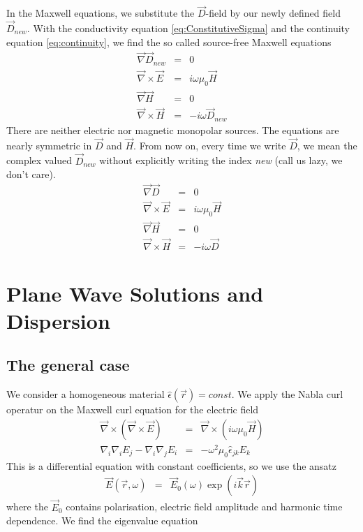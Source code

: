 \documentclass[12pt,a4paper,twoside,openright,BCOR10mm,headsepline,titlepage,abstracton,chapterprefix,final]{scrreprt}
\newcommand\vacuum{0}
\newcommand\Location{\Vector{r}}
\newcommand\wavenumber{k}
\newcommand\Wavevector{\Vector{\wavenumber}}
\newcommand\Vector[1]{\vec{#1}}
\newcommand\Nabla{\Vector{\nabla}}
\newcommand\Tensor[1]{\hat{#1}}
\newcommand\scalarEfield{E}
\newcommand\scalarHfield{H}
\newcommand\scalarDfield{D}
\newcommand\Efield{\Vector{\scalarEfield}}
\newcommand\Hfield{\Vector{\scalarHfield}}
\newcommand\Dfield{\Vector{\scalarDfield}}
\newcommand\vacuumpermeability{\mu_{\vacuum}}
\newcommand\permittivity{\Tensor{\epsilon}}
\begin{document}
In the Maxwell equations, we substitute the $\Dfield$-field by our newly defined field $\Dfield_{new}$.
With the conductivity equation \ref{eq:ConstitutiveSigma} and the continuity equation \ref{eq:continuity}, we find the so called source-free Maxwell equations
\begin{subequations}
\begin{eqnarray}
  \Nabla \Dfield_{new} &=& 0 					\\
  \Nabla \times \Efield &=& i \omega \vacuumpermeability \Hfield	\\
  \Nabla \Hfield &=& 0  					\\
  \Nabla \times \Hfield &=& - i \omega \Dfield_{new}  		
\end{eqnarray}
\end{subequations}
There are neither electric nor magnetic monopolar sources.
The equations are nearly symmetric in $\Dfield$ and $\Hfield$.
From now on, every time we write $\Dfield$, we mean the complex valued $\Dfield_{new}$ without explicitly writing the index \emph{new} (call us lazy, we don't care).
\begin{subequations}
\begin{eqnarray}
  \Nabla \Dfield &=& 0 					\\
  \Nabla \times \Efield &=& i \omega \vacuumpermeability \Hfield	\\
  \Nabla \Hfield &=& 0  					\\
  \Nabla \times \Hfield &=& - i \omega \Dfield  		
\end{eqnarray}
\label{eq:sourcefreemaxwell}
\end{subequations}

\section{Plane Wave Solutions and Dispersion}
\subsection{The general case}
We consider a homogeneous material $\permittivity(\Location) = const.$ We apply the Nabla curl operatur on the Maxwell curl equation for the electric field
\begin{eqnarray}
  \Nabla \times ( \Nabla \times \Efield ) &=& \Nabla \times ( i \omega \vacuumpermeability \Hfield ) 
  \\
  \nabla_i \nabla_i \scalarEfield_j - \nabla_i \nabla_j \scalarEfield_i &=& - \omega^2 \vacuumpermeability \permittivity_{jk} \scalarEfield_{k}
\end{eqnarray}
This is a differential equation with constant coefficients, so we use the ansatz
\begin{eqnarray}
 \Efield(\Location,\omega) &=& \Efield_0(\omega) \exp(i \Wavevector \Location)
\end{eqnarray}
where the $\Efield_0$ contains polarisation, electric field amplitude and harmonic time dependence. We find the eigenvalue equation
\end{document}
